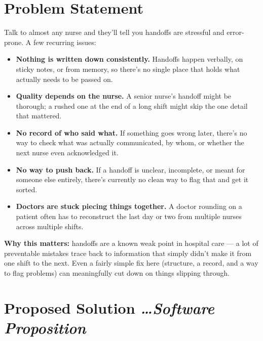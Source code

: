 \documentclass[11pt,a4paper]{article}
\newcommand{\BvrHint}[1]{%
  {\normalfont\normalsize\itshape\hfill #1}}
\begin{document}
\section{Problem Statement}
Talk to almost any nurse and they'll tell you handoffs are
stressful and error-prone. A few recurring issues:
\begin{itemize}[leftmargin=0.7cm]
    \item \textbf{Nothing is written down consistently.} Handoffs happen verbally, on sticky notes, or from memory, so there's no single place that holds what actually needs to be passed on.
    \item \textbf{Quality depends on the nurse.} A senior nurse's handoff might be thorough; a rushed one at the end of a long shift might skip the one detail that mattered.
    \item \textbf{No record of who said what.} If something goes wrong later, there's no way to check what was actually communicated, by whom, or whether the next nurse even acknowledged it.
    \item \textbf{No way to push back.} If a handoff is unclear, incomplete, or meant for someone else entirely, there's currently no clean way to flag that and get it sorted.
    \item \textbf{Doctors are stuck piecing things together.} A doctor rounding on a patient often has to reconstruct the last day or two from multiple nurses across multiple shifts.
\end{itemize}

\textbf{Why this matters:} handoffs are a known weak point in hospital care --- a lot of preventable mistakes trace back to information that simply didn't make it from one shift to the next. Even a fairly simple fix here (structure, a record, and a way to flag problems) can meaningfully cut down on things slipping through.

\section{Proposed Solution %
\BvrHint{\ldots Software Proposition}}
\end{document}
